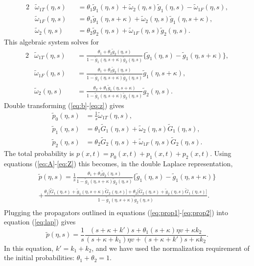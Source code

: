 \documentclass[draft,grl]{agujournal2018}
\newcommand\be{\begin{equation}}
\newcommand\ee{\end{equation}}
\newcommand\tom{\tilde{\omega}}
\newcommand\tg{\tilde{g}}
\newcommand\tp{\tilde{p}}
\newcommand\tG{\tilde{G}}
\begin{document}
\begin{alignat}{2}
&\tom_{1T}(\eta,s) &&= \theta_1 \tg_1(\eta,s) + \tom_2(\eta,s)\tg_1(\eta,s)-\tom_{1F}(\eta,s),\\
&\tom_{1F}(\eta,s) &&= \theta_1\tg_1(\eta,s+\kappa) + \tom_2(\eta,s)\tg_1(\eta,s+\kappa),\\
&\tom_2(\eta,s) &&= \theta_2 \tg_2(\eta,s) + \tom_{1F}(\eta,s)\tg_2(\eta,s).
\end{alignat}
This algebraic system solves for 
\begin{alignat}{2}
&\tom_{1T}(\eta,s) &&= \frac{\theta_1 + \theta_2 \tg_2(\eta,s)}{1-\tg_1(\eta,s+\kappa)\tg_2(\eta,s)}\big\{\tg_1(\eta,s)-\tg_1(\eta,s+\kappa) \big\}, \label{eq:A} \\
&\tom_{1F}(\eta,s) &&= \frac{\theta_1 + \theta_2 \tg_2(\eta,s)}{1-\tg_1(\eta,s+\kappa)\tg_2(\eta,s)}\tg_1(\eta,s+\kappa),\\
&\tom_{2}(\eta,s) &&= \frac{\theta_2 + \theta_1 \tg_1(\eta,s+\kappa)}{1-\tg_1(\eta,s+\kappa)\tg_2(\eta,s)}\tg_2(\eta,s). 
\end{alignat}
Double transforming (\ref{eq:b}-\ref{eq:z}) gives
\begin{align}
\tp_0(\eta,s) &= \frac{1}{s}\tom_{1T}(\eta,s),\\
\tp_1(\eta,s) &= \theta_1 \tG_1(\eta,s) + \tom_2(\eta,s) \tG_1(\eta,s),\\
\tp_2(\eta,s) &= \theta_2 \tG_2(\eta,s) + \tom_{1F}(\eta,s)\tG_2(\eta,s).\label{eq:Z}
\end{align}
The total probability is $p(x,t) = p_0(x,t) + p_1(x,t) + p_2(x,t)$. Using equations (\ref{eq:A}-\ref{eq:Z}) this becomes, in the double Laplace representation, 
\begin{multline}
\tp(\eta,s) = \frac{1}{s}\frac{\theta_1 + \theta_2 \tg_2(\eta,s)}{1-\tg_1(\eta,s+\kappa)\tg_2(\eta,s)}\big\{\tg_1(\eta,s)-\tg_1(\eta,s+\kappa) \big\} \\
+\frac{\theta_1\big[\tG_1(\eta,s) + \tg_1(\eta,s+\kappa)\tG_2(\eta,s)\big]+ \theta_2\big[\tG_2(\eta,s) + \tg_2(\eta,s)\tG_1(\eta,s)\big]}{1-\tg_1(\eta,s+\kappa)\tg_2(\eta,s)}. \\
\label{eq:lap}
\end{multline}
Plugging the propagators outlined in equations (\ref{eq:prop1}-\ref{eq:prop2}) into equation (\ref{eq:lap}) gives 
\be \tilde{p}(\eta,s) = \frac{1}{s}\frac{(s+\kappa + k')s  + \theta_1(s+\kappa )\eta v+ \kappa k_2}{(s+\kappa+k_1)\eta v+(s+\kappa+k')s + \kappa k_2}.\label{eq:nicedist}\ee
In this equation, $k'=k_1+k_2$, and we have used the normalization requirement of the initial probabilities: $\theta_1 + \theta_2 = 1.$
\end{document}
